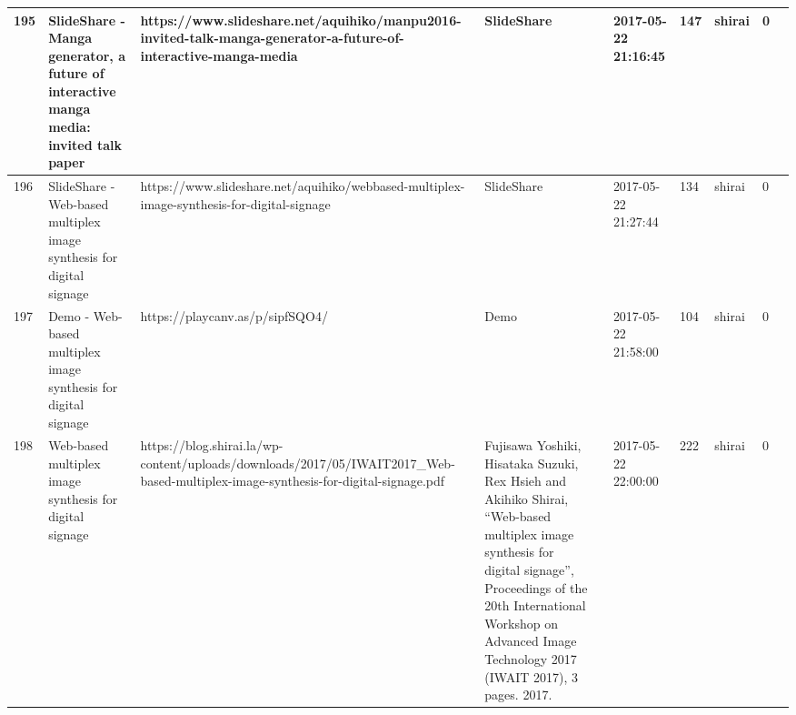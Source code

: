 \begin{longtable}{|l|l|l|l|l|l|l|l|l|l|}
195 & SlideShare - Manga generator, a future of interactive manga media: invited talk paper & https://www.slideshare.net/aquihiko/manpu2016-invited-talk-manga-generator-a-future-of-interactive-manga-media & SlideShare &  & 2017-05-22 21:16:45 & 147 & shirai & 0 &  \\ \hline 
196 & SlideShare - Web-based multiplex image synthesis for digital signage & https://www.slideshare.net/aquihiko/webbased-multiplex-image-synthesis-for-digital-signage & SlideShare &  & 2017-05-22 21:27:44 & 134 & shirai & 0 &  \\ \hline 
197 & Demo - Web-based multiplex image synthesis for digital signage & https://playcanv.as/p/sipfSQO4/ & Demo &  & 2017-05-22 21:58:00 & 104 & shirai & 0 &  \\ \hline 
198 & Web-based multiplex image synthesis for digital signage & https://blog.shirai.la/wp-content/uploads/downloads/2017/05/IWAIT2017\_Web-based-multiplex-image-synthesis-for-digital-signage.pdf & Fujisawa Yoshiki, Hisataka Suzuki, Rex Hsieh and Akihiko Shirai, “Web-based multiplex image synthesis for digital signage”, Proceedings of the 20th International Workshop on Advanced Image Technology 2017 (IWAIT 2017), 3 pages. 2017. &  & 2017-05-22 22:00:00 & 222 & shirai & 0 &  \\ \hline 
 \end{longtable}

